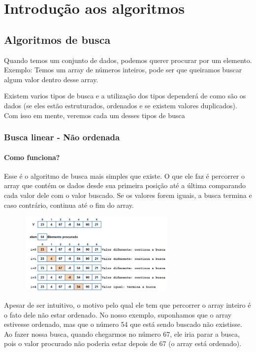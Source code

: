 \documentclass{report}
\begin{document}
	\chapter{Introdução aos algoritmos}
	\section{Algoritmos de busca}
	Quando temos um conjunto de dados, podemos querer procurar por um elemento. Exemplo: Temos um array de números inteiros, pode ser que queiramos buscar algum valor dentro desse array.
	
	Existem varios tipos de busca e a utilização dos tipos dependerá de como são os dados (se eles estão estruturados, ordenados e se existem valores duplicados). Com isso em mente, veremos cada um desses tipos de busca
	\subsection{Busca linear - Não ordenada}
	
	\subsubsection{Como funciona?}
	
	Esse é o algoritmo de busca mais simples que existe. O que ele faz é percorrer o array que contém os dados desde sua primeira posição até a última comparando cada valor dele com o valor buscado. Se os valores forem iguais, a busca termina e caso contrário, continua até o fim do array.
	
	
	\begin{center}
		
		\includegraphics[width=10cm,height=4cm,keepaspectratio=false]{imagens/blinearfuncionamento.png}
		
	\end{center}
	
	Apesar de ser intuitivo, o motivo pelo qual ele tem que percorrer o array inteiro é o fato dele não estar ordenado. No nosso exemplo, suponhamos que o array estivesse ordenado, mas que o número 54 que está sendo buscado não existisse. Ao fazer nossa busca, quando chegarmos no número 67, ele iria parar a busca, pois o valor procurado não poderia estar depois de 67 (o array está ordenado).
\end{document}
